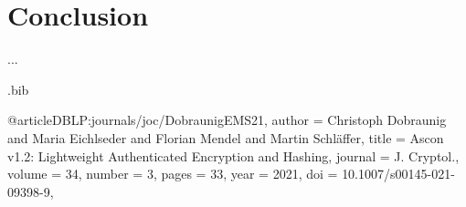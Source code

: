 \documentclass[a4paper]{llncs}
\begin{document}
\section{Conclusion}\label{sec:conclusion}

...


\ifspringer
  
\else
  
\fi
\iffinal
  
\else
  
\fi


\iffinal\else
\fi


\begin{filecontents*}[overwrite]{\jobname.bib}

@article{DBLP:journals/joc/DobraunigEMS21,
  author    = {Christoph Dobraunig and
               Maria Eichlseder and
               Florian Mendel and
               Martin Schl{\"{a}}ffer},
  title     = {{Ascon} v1.2: Lightweight Authenticated Encryption and Hashing},
  journal   = {J. Cryptol.},
  volume    = {34},
  number    = {3},
  pages     = {33},
  year      = {2021},
  doi       = {10.1007/s00145-021-09398-9},
}

\end{filecontents*}
\end{document}
